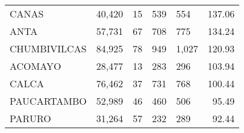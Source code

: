 \begin{tabular}{lrcclr}
	\cellcolor[HTML]{FFFF99}CANAS                                  & 40,420                                                         & 15                                                         & 539                  & 554                                                                 & 137.06                                                                       \\
	\cellcolor[HTML]{FFFF99}ANTA                                   & 57,731                                                         & 67                                                         & 708                  & 775                                                                 & 134.24                                                                       \\
	\cellcolor[HTML]{C6E0B4}CHUMBIVILCAS                           & 84,925                                                         & 78                                                         & 949                  & 1,027                                                               & 120.93                                                                       \\
	\cellcolor[HTML]{C6E0B4}ACOMAYO                                & 28,477                                                         & 13                                                         & 283                  & 296                                                                 & 103.94                                                                       \\
	\cellcolor[HTML]{C6E0B4}CALCA                                  & 76,462                                                         & 37                                                         & 731                  & 768                                                                 & 100.44                                                                       \\
	\cellcolor[HTML]{C6E0B4}PAUCARTAMBO                            & 52,989                                                         & 46                                                         & 460                  & 506                                                                 & 95.49                                                                        \\
	\cellcolor[HTML]{C6E0B4}PARURO                                 & 31,264                                                         & 57                                                         & 232                  & 289                                                                 & 92.44                                                                        \\

\end{tabular}
